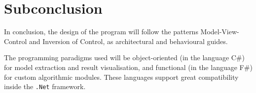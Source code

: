 \section{Subconclusion}\label{sec:Analysis-Subconclusion}

In conclusion, the design of the program will follow the patterns Model-View-Control and Inversion of Control, as architectural and behavioural guides.

The programming paradigms used will be object-oriented (in the language C\#) for model extraction and result visualisation, and functional (in the language F\#) for custom algorithmic modules. These languages support great compatibility inside the \texttt{.Net} framework.